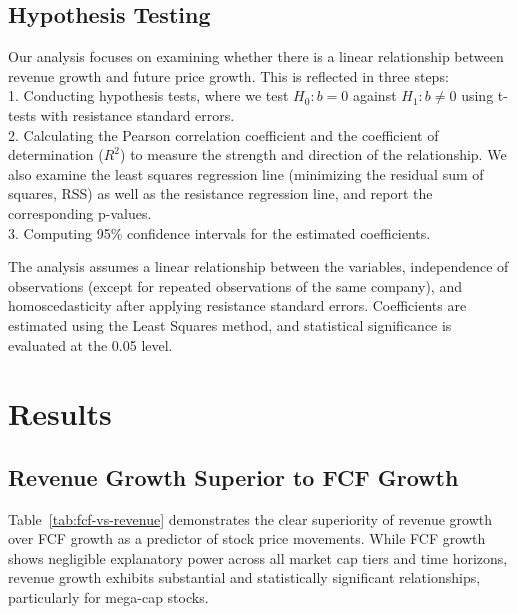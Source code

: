 \documentclass[11pt]{article}
\begin{document}


\subsection{Hypothesis Testing}

Our analysis focuses on examining whether there is a linear relationship between revenue growth and future price growth. This is reflected in three steps:  
\\ 1. Conducting hypothesis tests, where we test \( H_0: b = 0 \) against \( H_1: b \neq 0 \) using t-tests with resistance standard errors.
\\ 2. Calculating the Pearson correlation coefficient and the coefficient of determination (\(R^2\)) to measure the strength and direction of the relationship. We also examine the least squares regression line (minimizing the residual sum of squares, RSS) as well as the resistance regression line, and report the corresponding p-values.
\\ 3. Computing 95\% confidence intervals for the estimated coefficients.

The analysis assumes a linear relationship between the variables, independence of observations (except for repeated observations of the same company), and homoscedasticity after applying resistance standard errors. Coefficients are estimated using the Least Squares method, and statistical significance is evaluated at the 0.05 level.


\section{Results}

\subsection{Revenue Growth Superior to FCF Growth}

Table~\ref{tab:fcf-vs-revenue} demonstrates the clear superiority of revenue growth over FCF growth as a predictor of stock price movements. While FCF growth shows negligible explanatory power across all market cap tiers and time horizons, revenue growth exhibits substantial and statistically significant relationships, particularly for mega-cap stocks.
\end{document}
